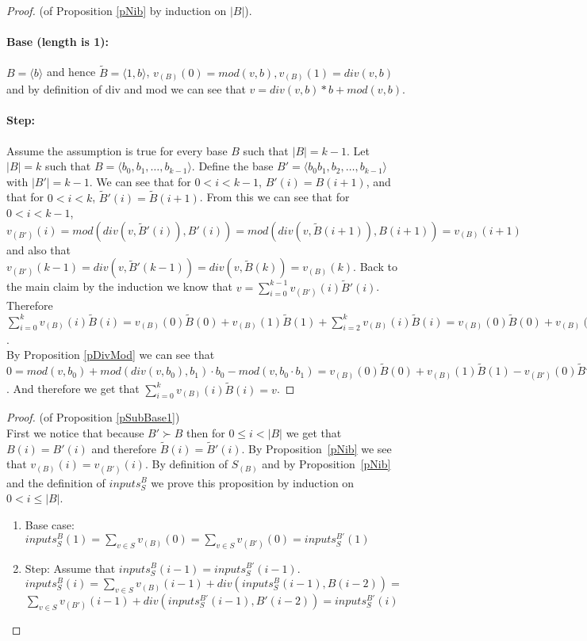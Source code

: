 \documentclass[envcountsame]{llncs}
\newcommand\tuple[1]{\langle #1 \rangle}
\begin{document}
\begin{proof}(of Proposition \ref{pNib} by induction on $|B|$). 
  \paragraph{Base (length is 1):} $B=\tuple{b}$ and hence $\tilde B =
  \tuple{1,b}$, $v_{(B)}(0)=mod(v,b), v_{(B)}(1)= div(v,b)$ and by
  definition of div and mod we can see
  that  $v=div(v,b)*b+mod(v,b)$.
  \paragraph{Step:} Assume the assumption is true for every base $B$
  such that $|B|=k-1$.  Let $|B|=k$ such that $B=\tuple{b_0,b_1,\ldots
    ,b_{k-1}}$. Define the base
  $B'=\tuple{b_{0}b_{1},b_2,\ldots,b_{k-1}}$ with $|B'|=k-1$.
We can see
  that for $0<i < k-1$, $B'(i)=B(i+1)$, and that for $0<i < k$,
  $\tilde B'(i)=\tilde B(i+1)$.  From this we can see that for $0< i
  <k-1$, $v_{(B')}(i)=mod(div(v,\tilde B'(i)),B'(i))=mod(div(v,\tilde
  B(i+1)),B(i+1))=v_{(B)}(i+1)$ and also that
  $v_{(B')}(k-1)=div(v,\tilde B'(k-1))=div(v,\tilde B(k))=v_{(B)}(k)$.
  Back to the main claim by the induction we know that
  $v=\sum_{i=0}^{k-1}v_{(B')}(i) \tilde B'(i)$.
  Therefore $\sum_{i=0}^{k}v_{(B)}(i) \tilde B(i) = v_{(B)}(0) \tilde B(0) +  v_{(B)}(1) \tilde B(1) + \sum_{i=2}^{k}v_{(B)}(i) 	\tilde B(i)= v_{(B)}(0) \tilde B(0) +  v_{(B)}(1) \tilde B(1) + \sum_{i=1}^{k-1}v_{(B')}(i) \tilde B'(i) =  v_{(B)}(0) \tilde B(0) +  v_{(B)}(1) \tilde B(1) + v -  v_{(B')}(0) \tilde B'(0)  $. \\
  By Proposition \ref{pDivMod} we can see that $0= mod(v,b_0) +
  mod(div(v,b_0),b_1)\cdot b_0 - mod(v, b_0 \cdot b_1) = v_{(B)}(0)
  \tilde B(0) + v_{(B)}(1) \tilde B(1) - v_{(B')}(0) \tilde B'(0)$.
  And therefore we get that $\sum_{i=0}^{k}v_{(B)}(i) \tilde B(i) = v
  $.
\end{proof} \bigskip

\begin{proof}(of Proposition \ref{pSubBase1})\\
  First we notice that because $B'\succ B$ then for $0\leq i<|B|$ we
  get that $B(i)=B'(i)$ and therefore $\tilde B(i) = \tilde B'(i)$. By
  Proposition~\ref{pNib} we see that $v_{(B)}(i)=v_{(B')}(i)$.  By
  definition of $S_{(B)}$ and by Proposition~\ref{pNib} and
  the definition of $inputs_S^B$ we prove this proposition by induction on \ $0<
  i \leq|B|$.
	\begin{enumerate}
		\item 
			Base case: $inputs_S^B(1)=\sum_{v \in S} v_{(B)}(0)=\sum_{v \in S} v_{(B')}(0)=inputs_S^{B'}(1)$
		\item 
			Step: Assume that $inputs_S^B(i-1)=inputs_S^{B'}(i-1)$.\\
			$inputs_S^B(i)=\sum_{v \in S}  v_{(B)}(i-1) + div(inputs_S^B(i-1) ,B(i-2)) =$\\
			$\sum_{v \in S}  v_{(B')}(i-1) + div(inputs_S^{B'}(i-1) ,B'(i-2))=inputs_S^{B'}(i)$
	\end{enumerate}
\end{proof} \bigskip
\end{document}
